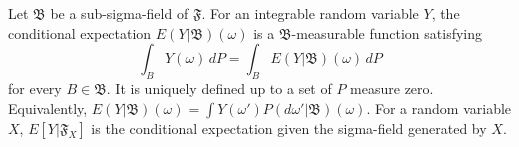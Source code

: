 Let $\mathfrak{B}$ be a sub-sigma-field of $\mathfrak{F}$. For an integrable random variable $Y$, the conditional expectation $E(Y|\mathfrak{B})(\omega)$ is a $\mathfrak{B}$-measurable function satisfying
$$\int_B Y(\omega) \, dP = \int_B E(Y|\mathfrak{B})(\omega) \, dP$$
for every $B \in \mathfrak{B}$. It is uniquely defined up to a set of $P$ measure zero. Equivalently, $E(Y|\mathfrak{B})(\omega) = \int Y(\omega') P(d\omega'|\mathfrak{B})(\omega)$. For a random variable $X$, $E[Y|\mathfrak{F}_X]$ is the conditional expectation given the sigma-field generated by $X$.
